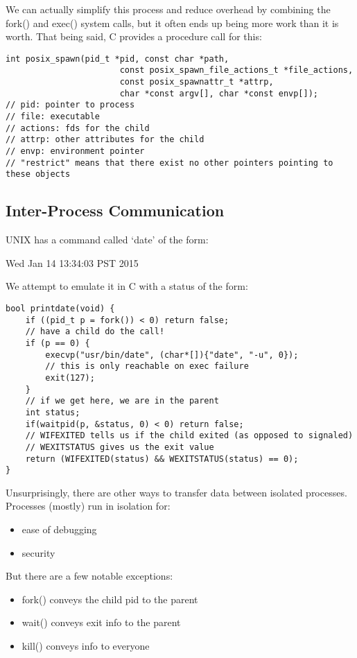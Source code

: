 \documentclass[../../lecture_notes.tex]{subfiles}
\begin{document}
We can actually simplify this process and reduce overhead by combining the fork() and exec() system calls, but it often ends up being more work than it is worth. That being said, C provides a procedure call for this:
\begin{lstlisting}
int posix_spawn(pid_t *pid, const char *path,
                       const posix_spawn_file_actions_t *file_actions,
                       const posix_spawnattr_t *attrp,
                       char *const argv[], char *const envp[]);
// pid: pointer to process
// file: executable
// actions: fds for the child
// attrp: other attributes for the child
// envp: environment pointer
// "restrict" means that there exist no other pointers pointing to these objects
\end{lstlisting}


\subsection{Inter-Process Communication}
UNIX has a command called ‘date’ of the form:
\begin{center} Wed Jan 14 13:34:03 PST 2015 \end{center}

We attempt to emulate it in C with a status of the form:
\begin{lstlisting}
bool printdate(void) {
	if ((pid_t p = fork()) < 0) return false;
	// have a child do the call!
	if (p == 0) {
		execvp("usr/bin/date", (char*[]){"date", "-u", 0});
		// this is only reachable on exec failure
		exit(127);
	}
	// if we get here, we are in the parent
	int status;
	if(waitpid(p, &status, 0) < 0) return false;
	// WIFEXITED tells us if the child exited (as opposed to signaled)
	// WEXITSTATUS gives us the exit value
	return (WIFEXITED(status) && WEXITSTATUS(status) == 0);
}
\end{lstlisting}

Unsurprisingly, there are other ways to transfer data between isolated processes.
Processes (mostly) run in isolation for:
\begin{itemize}[nosep]
\item ease of debugging
\item security
\end{itemize}

But there are a few notable exceptions:
\begin{itemize}[nosep]
\item fork() conveys the child pid to the parent
\item wait() conveys exit info to the parent
\item kill() conveys info to everyone
\end{itemize}
\end{document}
